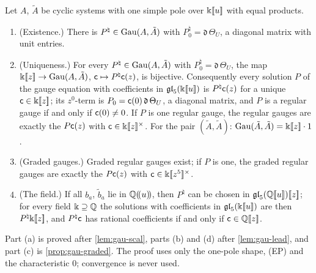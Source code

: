 \begin{thm}[Theorem U]
\label{thm:gau-U}
Let $A$, $\tilde A$ be cyclic systems with one simple pole over $\Bbbk[\![ u ]\!]$ with equal products.
\begin{enumerate}
\item[(a)] (Existence.) There is $P^\natural\in\operatorname{Gau}(A,\tilde A)$ with $P^\natural_0=\mathfrak d\,\Theta_U$, a diagonal matrix with unit entries.
\item[(b)] (Uniqueness.) For every $P^\natural\in\operatorname{Gau}(A,\tilde A)$ with $P^\natural_0=\mathfrak d\,\Theta_U$, the map $\Bbbk[\![ z ]\!]\to\operatorname{Gau}(A,\tilde A)$, $\mathsf{c}\mapsto P^\natural\mathsf{c}(z)$, is bijective. Consequently every solution $P$ of the gauge equation with coefficients in $\mathfrak{gl}_5(\Bbbk[\![ u ]\!])$ is $P^\natural\mathsf{c}(z)$ for a unique $\mathsf{c}\in\Bbbk[\![ z ]\!]$; its $z^0$-term is $P_0=\mathsf{c}(0)\,\mathfrak d\,\Theta_U$, a diagonal matrix, and $P$ is a regular gauge if and only if $\mathsf{c}(0)\neq0$. If $P$ is one regular gauge, the regular gauges are exactly the $P\mathsf{c}(z)$ with $\mathsf{c}\in\Bbbk[\![ z ]\!]^\times$. For the pair $(\tilde A,\tilde A)$: $\operatorname{Gau}(\tilde A,\tilde A)=\Bbbk[\![ z ]\!]\cdot1$.
\item[(c)] (Graded gauges.) Graded regular gauges exist; if $P$ is one, the graded regular gauges are exactly the $P\mathsf{c}(z)$ with $\mathsf{c}\in\Bbbk[\![ z^5 ]\!]^\times$.
\item[(d)] (The field.) If all $b_a$, $\tilde b_a$ lie in $\mathbb{Q}(\!(u)\!)$, then $P^\natural$ can be chosen in $\mathfrak{gl}_5(\mathbb{Q}[\![ u ]\!])[\![ z ]\!]$; for every field $\Bbbk\supseteq\mathbb{Q}$ the solutions with coefficients in $\mathfrak{gl}_5(\Bbbk[\![ u ]\!])$ are then $P^\natural\Bbbk[\![ z ]\!]$, and $P^\natural\mathsf{c}$ has rational coefficients if and only if $\mathsf{c}\in\mathbb{Q}[\![ z ]\!]$.
\end{enumerate}
\end{thm}

Part (a) is proved after \cref{lem:gau-scal}, parts (b) and (d) after \cref{lem:gau-lead}, and part (c) is \cref{prop:gau-graded}. The proof uses only the one-pole shape, (EP) and the characteristic $0$; convergence is never used.

